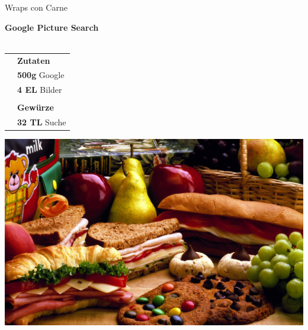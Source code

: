 \begin{cleanrecipe}{Wraps con Carne}

	
	\preparation{\blindtext}
\end{cleanrecipe}


	
\begin{center}
	\Huge 
	\textbf{Google Picture Search}\\
	\vspace*{-\baselineskip}
	\vspace{0.4cm}
	\\
	\normalsize
	\Oven
\end{center}
	\begin{table}
		\begin{tabulary}{4cm}{rL}
			& \textbf{Zutaten} \\
			& \textbf{500g} Google \\
			& \textbf{4 EL} Bilder \\
			& \\
			& \textbf{Gewürze} \\
			& \textbf{32 TL} Suche \\
		\end{tabulary}
	\end{table}	

\blindtext
\blindtext
\vfill
\begin{minipage}[b][0.5\textheight][t]{\textwidth}
		\centering
		\includegraphics[width=\textwidth, height=0.35\textheight]{pictures/somefood.jpg}
\end{minipage}

